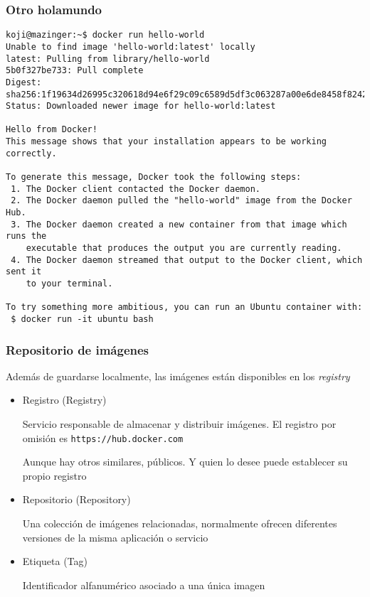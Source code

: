 \documentclass[ucs]{beamer}
\begin{document}
\begin{frame}[fragile]
\frametitle{Otro holamundo}

  \begin{scriptsize}
  \begin{verbatim}
koji@mazinger:~$ docker run hello-world
Unable to find image 'hello-world:latest' locally
latest: Pulling from library/hello-world
5b0f327be733: Pull complete 
Digest: sha256:1f19634d26995c320618d94e6f29c09c6589d5df3c063287a00e6de8458f8242
Status: Downloaded newer image for hello-world:latest

Hello from Docker!
This message shows that your installation appears to be working correctly.

To generate this message, Docker took the following steps:
 1. The Docker client contacted the Docker daemon.
 2. The Docker daemon pulled the "hello-world" image from the Docker Hub.
 3. The Docker daemon created a new container from that image which runs the
    executable that produces the output you are currently reading.
 4. The Docker daemon streamed that output to the Docker client, which sent it
    to your terminal.

To try something more ambitious, you can run an Ubuntu container with:
 $ docker run -it ubuntu bash
  \end{verbatim}
  \end{scriptsize}

\end{frame}


\begin{frame}[fragile]
\frametitle{Repositorio de imágenes}
Además de guardarse localmente, las imágenes están disponibles
en los \emph{registry}
\begin{itemize}
\item
Registro (Registry)

Servicio responsable de almacenar y distribuir imágenes. El registro
por omisión es \verb|https://hub.docker.com|

Aunque hay otros similares, públicos. Y quien lo desee puede establecer su
propio registro

\item
Repositorio (Repository)

Una colección de imágenes relacionadas, normalmente ofrecen diferentes versiones
de la misma aplicación o servicio

\item
Etiqueta (Tag)

Identificador alfanumérico asociado a una única imagen

\end{itemize}

\end{frame}
\end{document}
